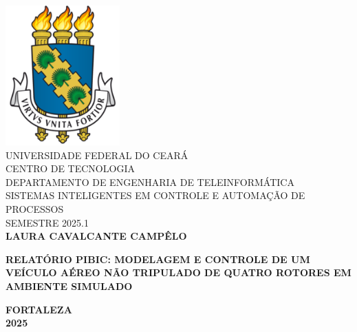 



\clearpage
\thispagestyle{empty}

\begin{bfseries}
\begin{center}

\includegraphics[scale=0.45]{figs/ufc.png} \\
\vspace{-4pt} 
UNIVERSIDADE FEDERAL DO CEARÁ \\
\vspace{4pt} 
CENTRO DE TECNOLOGIA \\
\vspace{4pt} 
DEPARTAMENTO DE ENGENHARIA DE TELEINFORMÁTICA \\
\vspace{4pt}
SISTEMAS INTELIGENTES EM CONTROLE E AUTOMAÇÃO DE PROCESSOS \\
\vspace{4pt}
SEMESTRE 2025.1 \\

\vspace*{\fill}
\textbf{LAURA CAVALCANTE CAMPÊLO}
\vspace*{\fill}

\vspace*{\fill}
\textbf{RELATÓRIO PIBIC: MODELAGEM E CONTROLE DE UM VEÍCULO AÉREO NÃO TRIPULADO DE QUATRO ROTORES EM AMBIENTE SIMULADO}
\vspace*{\fill}

\vspace*{\fill}
\textbf{FORTALEZA}\\
\textbf{2025}

\end{center}

\end{bfseries}

\newpage
\tableofcontents
\newpage













